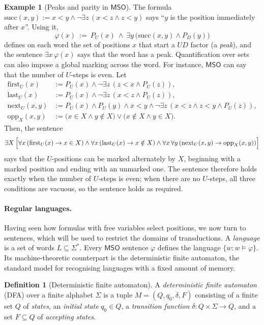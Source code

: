 \documentclass[11pt]{article}
\theoremstyle{definition}
\newtheorem{definition}[theorem]{Definition}
\newtheorem{example}[theorem]{Example}
\newcommand{\MSO}{\mathsf{MSO}}
\begin{document}
\begin{example}[Peaks and parity in $\MSO$]
The formula $\mathrm{succ}(x,y):=x<y\wedge\neg\exists z\,(x<z\wedge z<y)$ says
``$y$ is the position immediately after $x$''.  Using it,
\[
   \varphi(x)\ :=\ P_U(x)\ \wedge\ \exists y\,\bigl(\mathrm{succ}(x,y)\wedge P_D(y)\bigr)
\]
defines on each word the set of positions $x$ that start a $UD$ factor (a
\emph{peak}), and the sentence $\exists x\,\varphi(x)$ says that the word has a
peak.  Quantification over sets can also impose a global marking across the
word.  For instance, $\MSO$ can say that the number of $U$-steps is even.  Let
\[
\begin{aligned}
   \mathrm{first}_U(x)&:=P_U(x)\wedge\neg\exists z\,(z<x\wedge P_U(z)),\\
   \mathrm{last}_U(x)&:=P_U(x)\wedge\neg\exists z\,(x<z\wedge P_U(z)),\\
   \mathrm{next}_U(x,y)&:=P_U(x)\wedge P_U(y)\wedge x<y
      \wedge\neg\exists z\,(x<z\wedge z<y\wedge P_U(z)),\\
   \mathrm{opp}_X(x,y)&:=
   \bigl(x\in X\wedge y\notin X\bigr)
   \vee
   \bigl(x\notin X\wedge y\in X\bigr).
\end{aligned}
\]
Then, the sentence
\[
\exists X\,\Bigl[
   \forall x\,(\mathrm{first}_U(x)\rightarrow x\in X)
   \wedge
   \forall x\,(\mathrm{last}_U(x)\rightarrow x\notin X)
   \wedge
   \forall x\,\forall y\,(\mathrm{next}_U(x,y)\rightarrow
      \mathrm{opp}_X(x,y))
\Bigr]
\]
says that the $U$-positions can be marked alternately by $X$, beginning with a
marked position and ending with an unmarked one.  The sentence therefore holds
exactly when the number of $U$-steps is even; when there are no $U$-steps, all
three conditions are vacuous, so the sentence holds as required.
\end{example}

\paragraph{Regular languages.}
Having seen how formulas with free variables select positions, we now turn to
sentences, which will be used to restrict the domains of transductions.  A
\emph{language} is a set of words $L\subseteq\Sigma^*$.  Every $\MSO$ sentence
$\varphi$ defines the language $\{w:w\models\varphi\}$.  Its machine-theoretic
counterpart is the deterministic finite automaton, the standard model for
recognising languages with a fixed amount of memory.

\begin{definition}[Deterministic finite automaton]\label{def:dfa}
A \emph{deterministic finite automaton} (DFA) over a finite alphabet $\Sigma$ is
a tuple $M=(Q,q_0,\delta,F)$ consisting of a finite set $Q$ of \emph{states}, an
\emph{initial state} $q_0\in Q$, a \emph{transition function}
$\delta\colon Q\times\Sigma\to Q$, and a set $F\subseteq Q$ of \emph{accepting
states}.
\end{definition}
\end{document}
